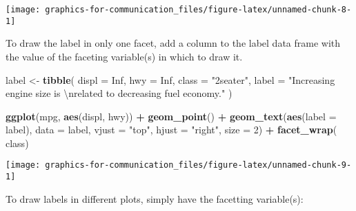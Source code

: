\documentclass[]{book}
\newenvironment{Shaded}{\begin{snugshade}}{\end{snugshade}}
\newcommand{\CharTok}[1]{\textcolor[rgb]{0.31,0.60,0.02}{#1}}
\newcommand{\DataTypeTok}[1]{\textcolor[rgb]{0.13,0.29,0.53}{#1}}
\newcommand{\DecValTok}[1]{\textcolor[rgb]{0.00,0.00,0.81}{#1}}
\newcommand{\KeywordTok}[1]{\textcolor[rgb]{0.13,0.29,0.53}{\textbf{#1}}}
\newcommand{\NormalTok}[1]{#1}
\newcommand{\OperatorTok}[1]{\textcolor[rgb]{0.81,0.36,0.00}{\textbf{#1}}}
\newcommand{\OtherTok}[1]{\textcolor[rgb]{0.56,0.35,0.01}{#1}}
\newcommand{\StringTok}[1]{\textcolor[rgb]{0.31,0.60,0.02}{#1}}
\theoremstyle{plain}
\theoremstyle{remark}
\begin{document}
\begin{center}\texttt{[image: graphics-for-communication\_files/figure-latex/unnamed-chunk-8-1]} \end{center}

To draw the label in only one facet, add a column to the label data
frame with the value of the faceting variable(s) in which to draw it.

\begin{Shaded}
\begin{Highlighting}[]
\NormalTok{label <-}\StringTok{ }\KeywordTok{tibble}\NormalTok{(}
  \DataTypeTok{displ =} \OtherTok{Inf}\NormalTok{,}
  \DataTypeTok{hwy =} \OtherTok{Inf}\NormalTok{,}
  \DataTypeTok{class =} \StringTok{"2seater"}\NormalTok{,}
  \DataTypeTok{label =} \StringTok{"Increasing engine size is }\CharTok{\textbackslash{}n}\StringTok{related to decreasing fuel economy."}
\NormalTok{)}

\KeywordTok{ggplot}\NormalTok{(mpg, }\KeywordTok{aes}\NormalTok{(displ, hwy)) }\OperatorTok{+}
\StringTok{  }\KeywordTok{geom_point}\NormalTok{() }\OperatorTok{+}
\StringTok{  }\KeywordTok{geom_text}\NormalTok{(}\KeywordTok{aes}\NormalTok{(}\DataTypeTok{label =}\NormalTok{ label), }\DataTypeTok{data =}\NormalTok{ label, }\DataTypeTok{vjust =} \StringTok{"top"}\NormalTok{, }\DataTypeTok{hjust =} \StringTok{"right"}\NormalTok{,}
            \DataTypeTok{size =} \DecValTok{2}\NormalTok{) }\OperatorTok{+}
\StringTok{  }\KeywordTok{facet_wrap}\NormalTok{(}\OperatorTok{~}\StringTok{ }\NormalTok{class)}
\end{Highlighting}
\end{Shaded}

\begin{center}\texttt{[image: graphics-for-communication\_files/figure-latex/unnamed-chunk-9-1]} \end{center}

To draw labels in different plots, simply have the facetting
variable(s):
\end{document}
